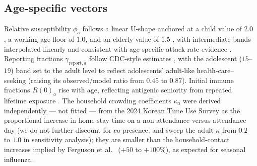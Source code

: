 \documentclass[12pt]{article}
\theoremstyle{plain}
\theoremstyle{remark}
\theoremstyle{definition}
\begin{document}
\subsection{Age-specific vectors}
Relative susceptibility $\phi_a$ follows a linear U-shape anchored at a child value of $2.0$ \cite{Cauchemez2009,Layan2024}, a working-age floor of $1.0$, and an elderly value of $1.5$ \cite{Panatto2018}, with intermediate bands interpolated linearly and consistent with age-specific attack-rate evidence \cite{Jayasundara2014}. Reporting fractions $\gamma_{\mathrm{report},a}$ follow CDC-style estimates \cite{Reed2015}, with the adolescent ($15$--$19$) band set to the adult level to reflect adolescents' adult-like health-care--seeking (raising its observed/model ratio from $0.45$ to $0.87$). Initial immune fractions $R(0)_a$ rise with age, reflecting antigenic seniority from repeated lifetime exposure \cite{Sicca2022,Hancock2009,Dudareva2011}. The household crowding coefficients $\kappa_a$ were derived independently --- not fitted --- from the 2024 Korean Time Use Survey \cite{StatKorea2024} as the proportional increase in home-stay time on a non-attendance versus attendance day (we do not further discount for co-presence, and sweep the adult $\kappa$ from $0.2$ to $1.0$ in sensitivity analysis); they are smaller than the household-contact increases implied by Ferguson et al.\ \cite{Ferguson2006} ($+50$ to $+100\%$), as expected for seasonal influenza.
\end{document}
